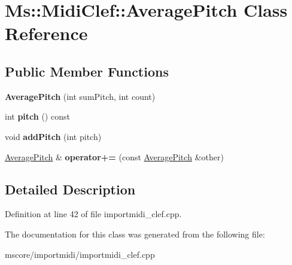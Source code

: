 \hypertarget{class_ms_1_1_midi_clef_1_1_average_pitch}{}\section{Ms\+:\+:Midi\+Clef\+:\+:Average\+Pitch Class Reference}
\label{class_ms_1_1_midi_clef_1_1_average_pitch}
\subsection*{Public Member Functions}
\begin{DoxyCompactItemize}
\item 
\mbox{\label{class_ms_1_1_midi_clef_1_1_average_pitch_a97f5f0d510f776198856529dcefbdf45}} 
{\bfseries Average\+Pitch} (int sum\+Pitch, int count)
\item 
\mbox{\label{class_ms_1_1_midi_clef_1_1_average_pitch_a663d63c9224a9062ae59d7c9c8cd0bd5}} 
int {\bfseries pitch} () const
\item 
\mbox{\label{class_ms_1_1_midi_clef_1_1_average_pitch_ae158021c9922d2de04d6cba9c49e7495}} 
void {\bfseries add\+Pitch} (int pitch)
\item 
\mbox{\label{class_ms_1_1_midi_clef_1_1_average_pitch_a3af14e63b902847f467b2a3c131a1317}} 
\hyperlink{class_ms_1_1_midi_clef_1_1_average_pitch}{Average\+Pitch} \& {\bfseries operator+=} (const \hyperlink{class_ms_1_1_midi_clef_1_1_average_pitch}{Average\+Pitch} \&other)
\end{DoxyCompactItemize}


\subsection{Detailed Description}


Definition at line 42 of file importmidi\+\_\+clef.\+cpp.



The documentation for this class was generated from the following file\+:\begin{DoxyCompactItemize}
\item 
mscore/importmidi/importmidi\+\_\+clef.\+cpp\end{DoxyCompactItemize}
